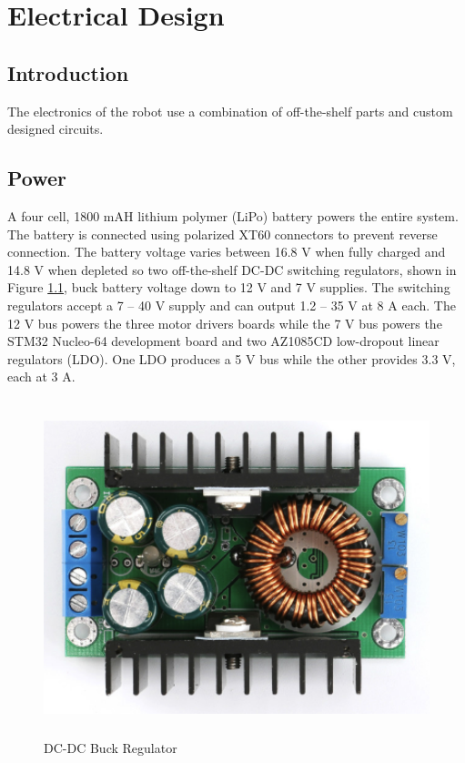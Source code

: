 \chapter{Electrical Design}
\section{Introduction}
The electronics of the robot use a combination of off-the-shelf parts and custom designed circuits. 

\section{Power}
A four cell, 1800 mAH lithium polymer (LiPo) battery powers the entire system. The battery is connected using polarized XT60 connectors to prevent reverse connection. The battery voltage varies between 16.8 V when fully charged and 14.8 V when depleted so two off-the-shelf DC-DC switching regulators, shown in Figure \ref{fig:smps}, buck battery voltage down to 12 V and 7 V supplies. The switching regulators accept a 7 -- 40 V supply and can output 1.2 -- 35 V at 8 A each. The 12 V bus powers the three motor drivers boards while the 7 V bus powers the STM32 Nucleo-64 development board and two AZ1085CD low-dropout linear regulators (LDO). One LDO produces a 5 V bus while the other provides 3.3 V, each at 3 A. 

\begin{figure}[H]   %
	\centering \includegraphics[width=6in, height=3.85in, keepaspectratio]{figures/smps.png}
	\caption{DC-DC Buck Regulator \cite{smps}}\label{fig:smps}
\end{figure}

